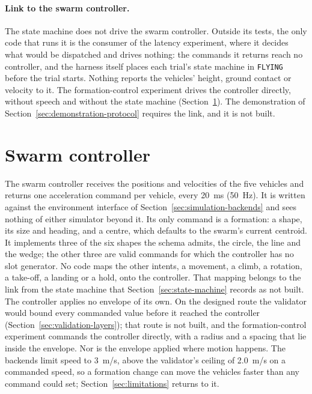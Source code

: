 \paragraph{Link to the swarm controller.} The state machine does not drive the swarm controller.
Outside its tests, the only code that runs it is the consumer of the latency experiment, where it
decides what would be dispatched and drives nothing: the commands it returns reach no controller,
and the harness itself places each trial's state machine in \texttt{FLYING} before the trial starts.
Nothing reports the vehicles' height, ground contact or velocity to it. The formation-control
experiment drives the controller directly, without speech and without the state machine
(Section~\ref{sec:swarm-controller}). The demonstration of
Section~\ref{sec:demonstration-protocol} requires the link, and it is not built.

\section{Swarm controller}
\label{sec:swarm-controller}
The swarm controller receives the positions and velocities of the five vehicles and returns one
acceleration command per vehicle, every 20~ms (50~Hz). It is written against the environment
interface of Section~\ref{sec:simulation-backends} and sees nothing of either simulator beyond it.
Its only command is a formation: a shape, its size and heading, and a centre, which defaults to the
swarm's current centroid. It implements three of the six shapes the schema admits, the circle, the
line and the wedge; the other three are valid commands for which the controller has no slot
generator. No code maps the other intents, a movement, a climb, a rotation, a take-off, a landing
or a hold, onto the controller. That mapping belongs to the link from the state machine that
Section~\ref{sec:state-machine} records as not built. The controller applies no envelope of its own.
On the designed route the validator would bound every commanded value before it reached the
controller (Section~\ref{sec:validation-layers}); that route is not built, and the
formation-control experiment commands the controller directly, with a radius and a spacing that
lie inside the envelope. Nor is the envelope applied where motion happens. The backends limit speed
to 3~m/s, above the validator's ceiling of 2.0~m/s on a commanded speed, so a formation change can
move the vehicles faster than any command could set; Section~\ref{sec:limitations} returns to it.

